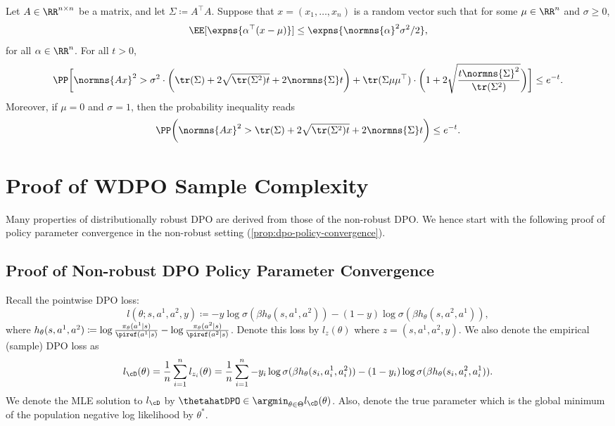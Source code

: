 \begin{lemma}\label{lem:psd-quadratic-form-concentration}
    Let $A\in\RR^{n\times n}$ be a matrix, and let $\Sigma\coloneqq A^{\top}A$. Suppose that $x=(x_1,\dots,x_n)$ is a random vector such that for some $\mu\in\RR^n$ and $\sigma\geq 0$,
    \begin{equation*}
        \EE[\expns{\alpha^{\top}(x-\mu)}] \leq \expns{\normns{\alpha}^2 \sigma^2/ 2},
    \end{equation*}
    for all $\alpha\in\RR^n$. For all $t>0$,
    \begin{equation*}
        \PP\bigg[\normns{Ax}^2 > \sigma^2 \cdot \bigg(\tr(\Sigma)+2\sqrt{\tr(\Sigma^2)t} + 2\normns{\Sigma}t \bigg) + \tr(\Sigma \mu\mu^{\top})\cdot \bigg( 1+ 2\sqrt{\frac{t\normns{\Sigma}^2}{\tr(\Sigma^2)}} \bigg)\bigg] \leq e^{-t}.
    \end{equation*}
    Moreover, if $\mu=0$ and $\sigma=1$, then the probability inequality reads
    \begin{equation*}
        \PP\bigg(\normns{Ax}^2 > \tr(\Sigma) + 2\sqrt{\tr(\Sigma^2)t} + 2\normns{\Sigma}t \bigg) \leq e^{-t}.
    \end{equation*}
\end{lemma}






\section{Proof of WDPO Sample Complexity}
Many properties of distributionally robust DPO are derived from those of the non-robust DPO. We hence start with the following proof of policy parameter convergence in the non-robust setting (\cref{prop:dpo-policy-convergence}).
\subsection{Proof of Non-robust DPO Policy Parameter Convergence}\label{sec:proof-of-dpo-policy-convergence}
Recall the pointwise DPO loss:
\begin{equation*}
    l(\theta;s,a^1,a^2,y) \coloneqq -y \log\sigma(\beta h_\theta(s,a^1,a^2)) - (1-y) \log\sigma(\beta h_\theta(s,a^2,a^1)),
\end{equation*}
where $h_\theta(s,a^1,a^2)\coloneqq \log\frac{\pi_\theta(a^1\mid s)}{\piref(a^1\mid s)}-\log\frac{\pi_\theta(a^2\mid s)}{\piref(a^2\mid s)}$. Denote this loss by $l_z(\theta)$ where $z=(s,a^1,a^2,y)$. We also denote the empirical (sample) DPO loss as
\begin{equation*}
    l_{\cD}(\theta) =\frac{1}{n}\sum_{i=1}^n l_{z_i}(\theta) = \frac{1}{n}\sum_{i=1}^n -y_i \log\sigma(\beta h_\theta(s_i,a^1_i,a^2_i)) - (1-y_i) \log\sigma(\beta h_\theta(s_i,a^2_i,a^1_i)).
\end{equation*}
We denote the MLE solution to $l_{\cD}$ by $\thetahatDPO\in\argmin_{\theta\in\Theta}l_{\cD}(\theta)$. Also, denote the true parameter which is the global minimum of the population negative log likelihood by $\theta^*$.

